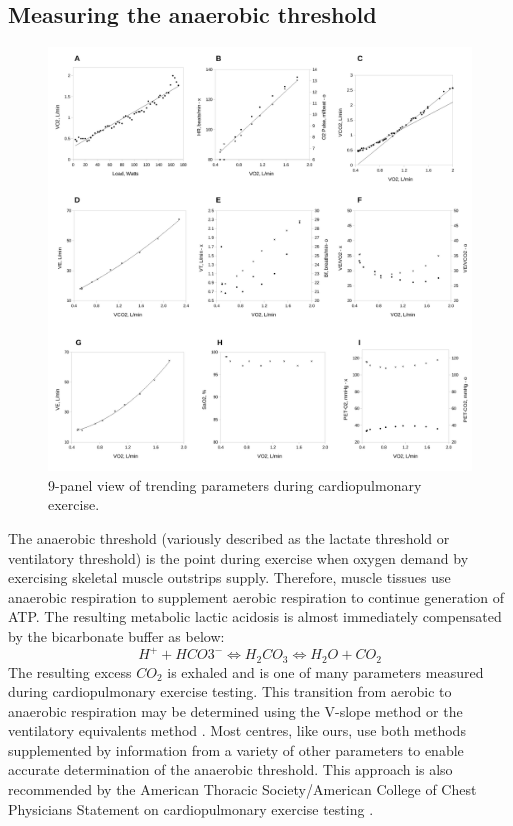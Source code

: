\subsection{Measuring the anaerobic threshold}
\label{sec:cpx_at_method}

\begin{figure}[htbp]
	\centering
	\includegraphics[width=\textwidth]{Figures/cpet_9panel.pdf}
	\caption{9-panel view of trending parameters during cardiopulmonary exercise.}
	\label{fig:cpet_9panel}
\end{figure}

The anaerobic threshold (variously described as the lactate threshold or ventilatory threshold) is the point during exercise when oxygen demand by exercising skeletal muscle outstrips supply. 
Therefore, muscle tissues use anaerobic respiration to supplement aerobic respiration to continue generation of ATP. 
The resulting metabolic lactic acidosis is almost immediately compensated by the bicarbonate buffer as below: 
\begin{equation} \label{eq:bicarb_buffer}
	H^+ + HCO3^- \Longleftrightarrow H_2CO_3 \Longleftrightarrow H_2O + CO_2
\end{equation}
The resulting excess $CO_2$ is exhaled and is one of many parameters measured during cardiopulmonary exercise testing. 
This transition from aerobic to anaerobic respiration may be determined using the V-slope method \parencite{sue_metabolic_1988} or the ventilatory equivalents method \parencite{beaver_new_1986}. 
Most centres, like ours, use both methods supplemented by information from a variety of other parameters to enable accurate determination of the anaerobic threshold.
This approach is also recommended by the American Thoracic Society/American College of Chest Physicians Statement on cardiopulmonary exercise testing \parencite{_ats/accp_2003}.

